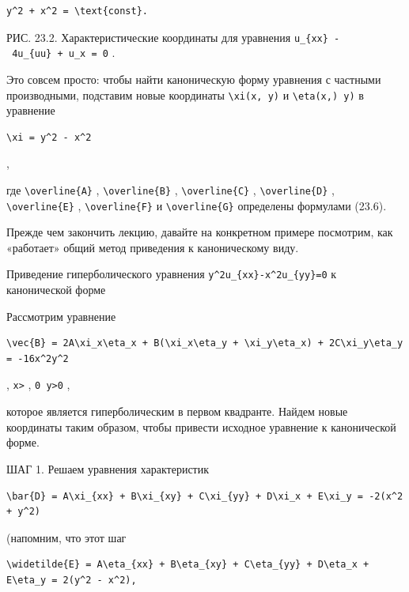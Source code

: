 \documentclass[
  ukrainian,
]{article}
\begin{document}
\begin{verbatim}
y^2 + x^2 = \text{const}.
\end{verbatim}

РИС. 23.2. Характеристические координаты для уравнения
\texttt{u\_\{xx\}\ -\ 4u\_\{uu\}\ +\ u\_x\ =\ 0} .

Это совсем просто: чтобы найти каноническую форму уравнения с частными
производными, подставим новые координаты
\texttt{\textbackslash{}xi(x,\ y)} и
\texttt{\textbackslash{}eta(x,)\ y)} в уравнение

\begin{verbatim}
\xi = y^2 - x^2
\end{verbatim}

,

где \texttt{\textbackslash{}overline\{A\}} ,
\texttt{\textbackslash{}overline\{B\}} ,
\texttt{\textbackslash{}overline\{C\}} ,
\texttt{\textbackslash{}overline\{D\}} ,
\texttt{\textbackslash{}overline\{E\}} ,
\texttt{\textbackslash{}overline\{F\}} и
\texttt{\textbackslash{}overline\{G\}} определены формулами (23.6).

Прежде чем закончить лекцию, давайте на конкретном примере посмотрим,
как «работает» общий метод приведения к каноническому виду.

Приведение гиперболического уравнения
\texttt{y\^{}2u\_\{xx\}-x\^{}2u\_\{yy\}=0} к канонической форме

Рассмотрим уравнение

\begin{verbatim}
\vec{B} = 2A\xi_x\eta_x + B(\xi_x\eta_y + \xi_y\eta_x) + 2C\xi_y\eta_y = -16x^2y^2
\end{verbatim}

, \texttt{x\textgreater{}} , \texttt{0\ y\textgreater{}0} ,

которое является гиперболическим в первом квадранте. Найдем новые
координаты таким образом, чтобы привести исходное уравнение к
канонической форме.

ШАГ 1. Решаем уравнения характеристик

\begin{verbatim}
\bar{D} = A\xi_{xx} + B\xi_{xy} + C\xi_{yy} + D\xi_x + E\xi_y = -2(x^2 + y^2)
\end{verbatim}

(напомним, что этот шаг

\begin{verbatim}
\widetilde{E} = A\eta_{xx} + B\eta_{xy} + C\eta_{yy} + D\eta_x + E\eta_y = 2(y^2 - x^2),
\end{verbatim}
\end{document}
